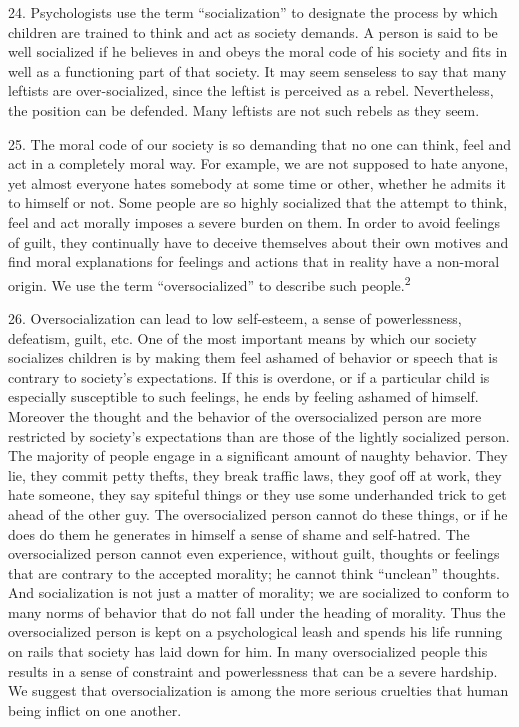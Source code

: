 \documentclass{article}
\begin{document}
\hspace{0.5cm} 24. Psychologists use the term “socialization” to designate the process by which children are 
trained to think and act as society demands. A person is said to be well socialized if he believes 
in and obeys the moral code of his society and fits in well as a functioning part of that society. It 
may seem senseless to say that many leftists are over-socialized, since the leftist is perceived as a 
rebel. Nevertheless, the position can be defended. Many leftists are not such rebels as they seem. \vspace{\baselineskip}

25. The moral code of our society is so demanding that no one can think, feel and act in a 
completely moral way. For example, we are not supposed to hate anyone, yet almost everyone 
hates somebody at some time or other, whether he admits it to himself or not. Some people are so 
highly socialized that the attempt to think, feel and act morally imposes a severe burden on 
them. In order to avoid feelings of guilt, they continually have to deceive themselves about their 
own motives and find moral explanations for feelings and actions that in reality have a non-moral 
origin. We use the term “oversocialized” to describe such people.\textsuperscript{2} \vspace{\baselineskip}

26. Oversocialization can lead to low self-esteem, a sense of powerlessness, defeatism, guilt, 
etc. One of the most important means by which our society socializes children is by making them 
feel ashamed of behavior or speech that is contrary to society’s expectations. If this is overdone, 
or if a particular child is especially susceptible to such feelings, he ends by feeling ashamed of 
himself. Moreover the thought and the behavior of the oversocialized person are more restricted 
by society’s expectations than are those of the lightly socialized person. The majority of people 
engage in a significant amount of naughty behavior. They lie, they commit petty thefts, they break 
traffic laws, they goof off at work, they hate someone, they say spiteful things or they use some 
underhanded trick to get ahead of the other guy. The oversocialized person cannot do these things, 
or if he does do them he generates in himself a sense of shame and self-hatred. The oversocialized 
person cannot even experience, without guilt, thoughts or feelings that are contrary to the accepted 
morality; he cannot think “unclean” thoughts. And socialization is not just a matter of morality; 
we are socialized to conform to many norms of behavior that do not fall under the heading of 
morality. Thus the oversocialized person is kept on a psychological leash and spends his life 
running on rails that society has laid down for him. In many oversocialized people this results in 
a sense of constraint and powerlessness that can be a severe hardship. We suggest that 
oversocialization is among the more serious cruelties that human being inflict on one another. \vspace{\baselineskip} \newpage
\end{document}
